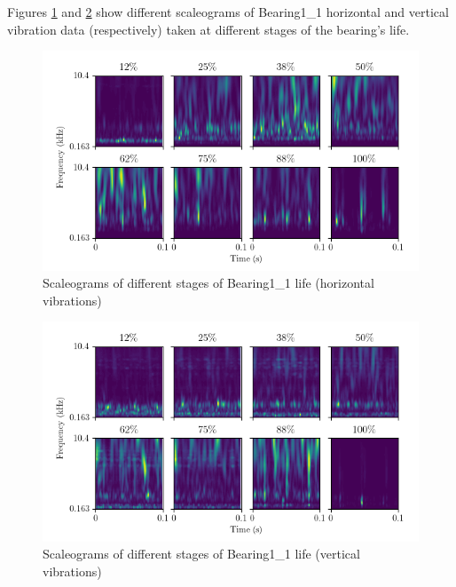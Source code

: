 Figures \ref{fig:bearings_fault_progress_scaleograms_h} and \ref{fig:bearings_fault_progress_scaleograms_v} show different scaleograms of Bearing1\_1 horizontal and vertical vibration data (respectively) taken at different stages of the bearing's life.

\begin{figure}[h]
	\centering
	\includegraphics[]{figures/femtocwt_scaleograms_h}
	\caption{Scaleograms of different stages of Bearing1\_1 life (horizontal vibrations)}%
	\label{fig:bearings_fault_progress_scaleograms_h}
\end{figure}

\begin{figure}[h]
	\centering
	\includegraphics[]{figures/femtocwt_scaleograms_v}
	\caption{Scaleograms of different stages of Bearing1\_1 life (vertical vibrations)}%
	\label{fig:bearings_fault_progress_scaleograms_v}
\end{figure}

